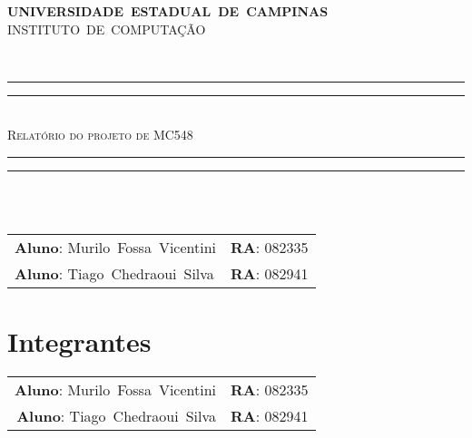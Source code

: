 \documentclass[11pt,letterpaper]{article}
\begin{document}
\thispagestyle{empty}

\begin{minipage}[h]{0.10\linewidth}
\end{minipage}
\begin{minipage}[h!]{0.7\linewidth}
  \vspace*{\fill}
  \centering
  {\large \textbf{UNIVERSIDADE~ESTADUAL~DE~CAMPINAS}}\\ 
  {\large INSTITUTO~DE~COMPUTAÇÃO}                   
  \vspace*{\fill} 
\end{minipage}
\\\vspace{0.5cm}

\begin{center} 
  \rule{11.0cm}{0.4pt}\vspace*{-\baselineskip}\vspace{-2.0pt}
  \rule{11.0cm}{1.6pt} \vspace*{1.0pt}\\
  {\Large \textsc{Relatório do projeto de MC548}}\\
  \vspace*{-\baselineskip}\vspace{4.2pt} \rule{11.0cm}{0.4pt}
  \vspace*{-\baselineskip}\vspace{3.2pt} \rule{11.0cm}{1.6pt}\\
  {\textsl{}}
  \\\vspace{1cm}
  \begin{tabular}{ll}
    \textbf{Aluno}:   Murilo~Fossa~Vicentini &
    \textbf{RA}:          082335 \\ 
    \textbf{Aluno}:        Tiago~Chedraoui~Silva & 
    \textbf{RA}:        082941 \\
  \end{tabular}
\end{center}
\vspace{0.5cm}

\tableofcontents
\listoftables
\listoffigures 

\vspace{2mm}
\newpage

\section{Integrantes}
\begin{tabular}{rl}
  \textbf{Aluno}:   Murilo~Fossa~Vicentini &
  \textbf{RA}:          082335 \\ 
  \textbf{Aluno}:        Tiago~Chedraoui~Silva & 
  \textbf{RA}:        082941 \\
\end{tabular}
\end{document}
